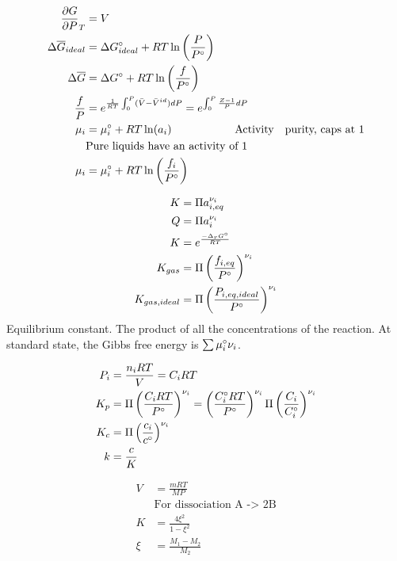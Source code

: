 \documentclass[10pt]{article} %
\begin{document}
\begin{align*}
  \frac{\partial G}{\partial P}_T &= V\\
  \Delta \overline{G}_{ideal} &= \Delta G_{ideal}\degree + RT\ln\left(\frac{P}{P\degree}\right)\\
  \Delta \overline{G} &= \Delta G\degree + RT\ln\left(\frac{f}{P\degree}\right)\\
  \frac{f}{P} &= e^{\frac{1}{RT}\int_0^P(\bar{V}-\bar{V}^{id})dP} = e^{\int_0^P\frac{Z-1}{P}dP}\\
  \mu_i &= \mu_i\degree + RT\ln(a_i) \hspace{2cm}\mbox{Activity ~ purity, caps at 1}\\
  &\mbox{Pure liquids have an activity of 1}\\
  \mu_i &= \mu_i\degree + RT\ln\left(\frac{f_i}{P\degree}\right)\\
\end{align*}

\begin{align*}
  K &= \Pi a_{i,eq}^{\nu_i}\\
  Q &= \Pi a_{i}^{\nu_i}\\
  K &= e^{\frac{-\Delta_r G\degree}{RT}}\\
  K_{gas} &= \Pi\left(\frac{f_{i,eq}}{P\degree}\right)^{\nu_i}\\
  K_{gas,ideal} &= \Pi\left(\frac{P_{i,eq,ideal}}{P\degree}\right)^{\nu_i}\\
\end{align*}
Equilibrium constant. The product of all the concentrations of the reaction. At standard state, the Gibbs free energy is $\sum \mu_i\degree\nu_i$.

\begin{align*}
  P_i &= \frac{n_iRT}{V} = C_iRT\\
  K_p &= \Pi \left(\frac{C_iRT}{P\degree}\right)^{\nu_i} = \left(\frac{C_i\degree RT}{P\degree}\right)^{\nu_i} \Pi \left(\frac{C_i}{C_i\degree}\right)^{\nu_i}\\
  K_c &= \Pi\left(\frac{c_i}{c\degree}\right)^{\nu_i}\\
  k &= \frac{c}{K}\\
\end{align*}

\begin{align*}
  V &= \frac{mRT}{MP}\\
  &\mbox{For dissociation A -> 2B}\\
  K &= \frac{4\xi^2}{1-\xi^2}\\
  \xi &= \frac{M_1-M_2}{M_2}\\
\end{align*}
\end{document}
